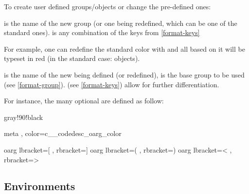 \documentclass{article}
\begin{document}
To create  user defined groups/objects or change the pre-defined ones:


\begin{codedescribe}[code,new=2023/05/16]{}
\begin{codesyntax} %
\end{codesyntax}
 is the name of the new group (or one being redefined, which can be one of the standard ones).  is any combination of the keys from \ref{format-keys}
\end{codedescribe}

For example, one can redefine the  standard color with  and all  based on it will be typeset in red (in the standard case:  objects).


\begin{codedescribe}[code,new=2023/05/16]{}
\begin{codesyntax} %
\end{codesyntax}
 is the name of the new  being defined (or redefined),
 is the base group to be used (see \ref{format-group}).  (see \ref{format-keys}) allow for further differentiation.
\end{codedescribe}
For instance, the many optional  are defined as follow:
\begin{codestore}
 { gray!90!black }

 { meta , color=c__codedesc_oarg_color }

 {oarg} { lbracket={[} , rbracket={]} }
 {oarg} { lbracket={(} , rbracket={)} }
 {oarg} { lbracket={<} , rbracket={>} }
\end{codestore}

\subsection{Environments}
\end{document}
